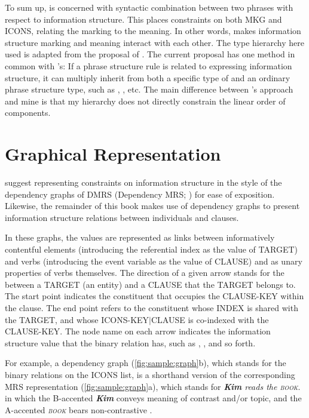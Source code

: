 To sum up,  is concerned with
syntactic combination between two phrases with respect to information
structure.  This places constraints on both MKG and ICONS, relating
the marking to the meaning. In other words,  makes
information structure marking and meaning interact with each other.
The type hierarchy here used is adapted from the proposal of
\citet{paggio:09}. The current proposal has one method in common with
\citeauthor{paggio:09}'s: If a phrase structure rule is related to
expressing information structure, it can multiply inherit from both a
specific type of  and an ordinary phrase structure type,
such as , , etc. The main
difference between \citeauthor{paggio:09}'s approach and mine is that
my  hierarchy does not directly constrain the linear order
of components.



\section{Graphical Representation}
\label{9:sec:graph}


\citet{song:bender:12} suggest representing constraints on information
structure in the style of the dependency graphs of DMRS (Dependency
MRS; \citealt{copestake:09}) for ease of exposition. Likewise,
the remainder of this book makes use of dependency graphs to present
information structure relations between individuals and clauses.

In these graphs, the  values are represented as links
between informatively contentful elements (introducing the referential
index as the value of TARGET) and verbs (introducing the event
variable as the value of CLAUSE) and as unary properties of verbs
themselves. The direction of a given arrow
stands for the  between a TARGET (an entity) and
a CLAUSE that the TARGET belongs to.  The start point indicates the
constituent that occupies the CLAUSE-KEY within the clause.  The end
point refers to the constituent whose INDEX is shared with the TARGET,
and whose ICONS-KEY{$\mid$}CLAUSE is co-indexed with the
CLAUSE-KEY. The node name on each arrow indicates the
information structure value that the binary relation has, such as
, , and so forth.

For example, a dependency graph (\ref{fig:sample:graph}b), which
stands for the binary relations on the ICONS list, is a shorthand
version of the corresponding MRS representation
(\ref{fig:sample:graph}a), which stands for \textit{\textbf{Kim} reads
  the \textsc{book}}. in which the B-accented \textit{\textbf{Kim}}
conveys meaning of contrast and/or topic, and the
A-accented \textit{\textsc{book}} bears non-contrastive
.


